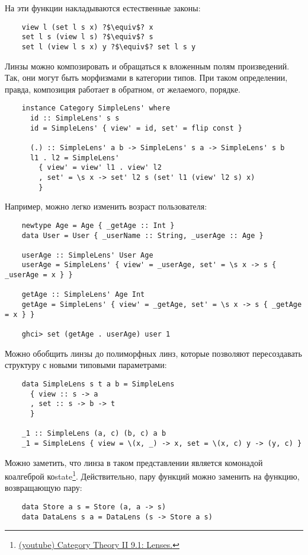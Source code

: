 На эти функции накладываются естественные законы:
\begin{verbatim}
    view l (set l s x) ?$\equiv$? x
    set l s (view l s) ?$\equiv$? s
    set l (view l s x) y ?$\equiv$? set l s y
\end{verbatim}

Линзы можно композировать и обращаться к вложенным полям произведений.
Так, они могут быть морфизмами в категории типов.
При таком определении, правда, композиция работает в обратном, от желаемого, порядке.
\begin{verbatim}
    instance Category SimpleLens' where
      id :: SimpleLens' s s
      id = SimpleLens' { view' = id, set' = flip const }

      (.) :: SimpleLens' a b -> SimpleLens' s a -> SimpleLens' s b
      l1 . l2 = SimpleLens'
        { view' = view' l1 . view' l2
        , set' = \s x -> set' l2 s (set' l1 (view' l2 s) x)
        }
\end{verbatim}

Например, можно легко изменить возраст пользователя:
\begin{verbatim}
    newtype Age = Age { _getAge :: Int }
    data User = User { _userName :: String, _userAge :: Age }

    userAge :: SimpleLens' User Age
    userAge = SimpleLens' { view' = _userAge, set' = \s x -> s { _userAge = x } }

    getAge :: SimpleLens' Age Int
    getAge = SimpleLens' { view' = _getAge, set' = \s x -> s { _getAge = x } }

    ghci> set (getAge . userAge) user 1
\end{verbatim}

Можно обобщить линзы до полиморфных линз, которые позволяют пересоздавать структуру с новыми типовыми параметрами:
\begin{verbatim}
    data SimpleLens s t a b = SimpleLens
      { view :: s -> a
      , set :: s -> b -> t
      }

    _1 :: SimpleLens (a, c) (b, c) a b
    _1 = SimpleLens { view = \(x, _) -> x, set = \(x, c) y -> (y, c) }
\end{verbatim}

Можно заметить, что линза в таком представлении является комонадой коалгеброй коstate\footnote{\href{https://youtu.be/9_iYlp8smc8?si=NLka0vnnhYDdTfgm}{(youtube) Category Theory II 9.1: Lenses.}}.
Действительно, пару функций можно заменить на функцию, возвращающую пару:
\begin{verbatim}
    data Store a s = Store (a, a -> s)
    data DataLens s a = DataLens (s -> Store a s)
\end{verbatim}

